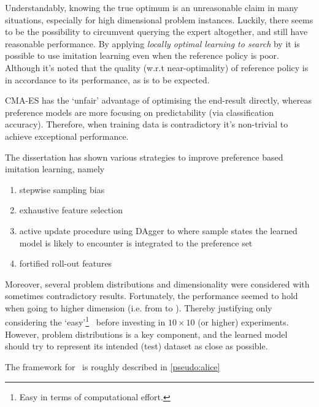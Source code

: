 Understandably, knowing the true optimum is an unreasonable claim in many 
situations, especially for high dimensional problem instances. 
Luckily, there seems to be the possibility to circumvent querying the expert 
altogether, and still have reasonable performance. 
By applying \emph{locally optimal learning to search} by \citet{ChangKADL15} it 
is possible to use imitation learning even when the reference policy is poor. 
Although it's noted that the quality (w.r.t near-optimality) of reference 
policy is in accordance to its performance, as is to be expected. 



CMA-ES has the `unfair' advantage of optimising the end-result directly, 
whereas preference models are more focusing on predictability (via 
classification accuracy). Therefore, when training data is contradictory it's 
non-trivial to achieve exceptional performance. 

The dissertation has shown various strategies to improve preference based 
imitation learning, namely
\begin{enumerate}
    \item stepwise sampling bias
    \item exhaustive feature selection
    \item active update procedure using DAgger to where sample states the 
    learned model is likely to encounter is integrated to the preference set
    \item fortified roll-out features
\end{enumerate}
Moreover, several problem distributions and dimensionality were considered with 
sometimes contradictory results. Fortunately, the performance seemed to hold 
when going to higher dimension (i.e. from \Problem[6\times5]{} to 
\Problem[10\times10]{}). Thereby justifying only considering the 
`easy'\footnote{Easy in terms of computational effort.} \JSP\ before investing 
in $10\times10$ (or higher) experiments. 
However, problem distributions is a key component, and the learned model should 
try to represent its intended (test) dataset as close as possible.



The framework for \Alice\ is roughly described in \cref{pseudo:alice}




